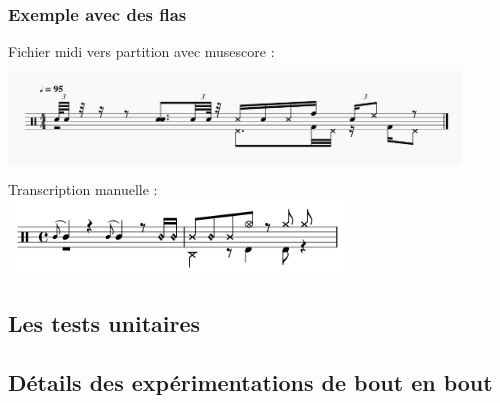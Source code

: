 \subsubsection{Exemple avec des flas}
Fichier midi vers partition avec musescore :\\
\includegraphics[height=30mm, width=120mm]{z_images/transcriptions_manuelles/1_transcriptions_flas/124_funk_95_fill_4-4_0.png}\\
Transcription manuelle :\\
\includegraphics[height=20mm, width=90mm]{z_images/transcriptions_manuelles/1_transcriptions_flas/124_funk_95_fill_4-4_1_.png}\\
\subsection*{Les tests unitaires}
\subsection*{Détails des expérimentations de bout en bout}
